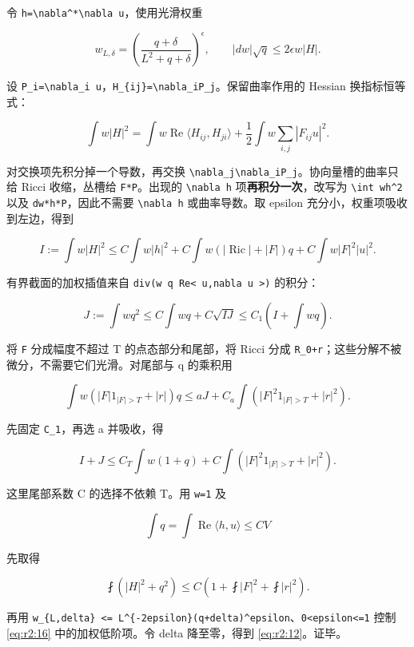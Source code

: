 \documentclass[UTF8,11pt,openany,oneside,fontset=none]{ctexbook}
\begin{document}
令 \texttt{h=\textbackslash{}nabla\^{}*\textbackslash{}nabla\ u}，使用光滑权重

\[
 w_{L,\delta}=\left(\frac{q+\delta}{L^2+q+\delta}\right)^\epsilon,
 \qquad |dw|\sqrt q\le2\epsilon w|H|.
\]

设 \texttt{P\_i=\textbackslash{}nabla\_i\ u}，\texttt{H\_\{ij\}=\textbackslash{}nabla\_iP\_j}。保留曲率作用的 Hessian 换指标恒等式：

\[
 \int w|H|^2=
 \int w\operatorname{Re}\langle H_{ij},H_{ji}\rangle
 +\frac12\int w\sum_{i,j}|F_{ij}u|^2.
 \tag{2.13}\label{eq:r2:13}
\]

对交换项先积分掉一个导数，再交换 \texttt{\textbackslash{}nabla\_j\textbackslash{}nabla\_iP\_j}。协向量槽的曲率只给 Ricci 收缩，丛槽给 \texttt{F*P}。出现的 \texttt{\textbackslash{}nabla\ h} 项\textbf{再积分一次}，改写为 \texttt{\textbackslash{}int\ w\textbar{}h\textbar{}\^{}2} 以及 \texttt{dw*h*P}，因此不需要 \texttt{\textbackslash{}nabla\ h} 或曲率导数。取 epsilon 充分小，权重项吸收到左边，得到

\[
 I:=\int w|H|^2
 \le C\int w|h|^2
 +C\int w(|\operatorname{Ric}|+|F|)q
 +C\int w|F|^2|u|^2.
 \tag{2.14}\label{eq:r2:14}
\]

有界截面的加权插值来自 \texttt{div(w\ q\ Re\textless{}\ u,nabla\ u\ \textgreater{})} 的积分：

\[
 J:=\int wq^2
 \le C\int wq+C\sqrt{IJ}
 \le C_1\left(I+\int wq\right).
 \tag{2.15}\label{eq:r2:15}
\]

将 \texttt{F} 分成幅度不超过 T 的点态部分和尾部，将 Ricci 分成 \texttt{R\_0+r}；这些分解不被微分，不需要它们光滑。对尾部与 q 的乘积用

\[
 \int w(|F|1_{|F|>T}+|r|)q
 \le aJ+C_a\int(|F|^2 1_{|F|>T}+|r|^2).
\]

先固定 \texttt{C\_1}，再选 a 并吸收，得

\[
 I+J\le C_T\int w(1+q)
 +C\int(|F|^2 1_{|F|>T}+|r|^2).
 \tag{2.16}\label{eq:r2:16}
\]

这里尾部系数 C 的选择不依赖 T。用 \texttt{w=1} 及

\[
 \int q=\int\operatorname{Re}\langle h,u\rangle\le C V
\]

先取得

\[
 \fint(|H|^2+q^2)\le C\left(1+\fint|F|^2+\fint|r|^2\right).
\]

再用 \texttt{w\_\{L,delta\}\ \textless{}=\ L\^{}\{-2epsilon\}(q+delta)\^{}epsilon}、\texttt{0\textless{}epsilon\textless{}=1} 控制 \eqref{eq:r2:16} 中的加权低阶项。令 delta 降至零，得到 \eqref{eq:r2:12}。证毕。
\end{document}
